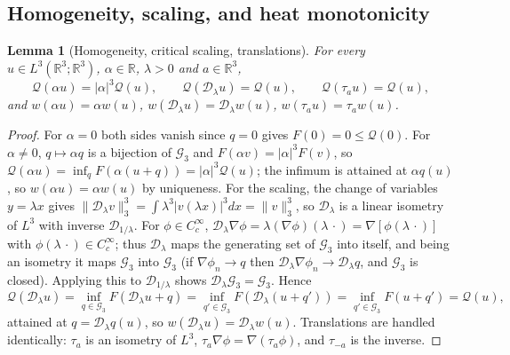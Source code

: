 \documentclass[11pt]{article}
\newtheorem{lemma}[theorem]{Lemma}
\theoremstyle{definition}
\theoremstyle{plain}
\newcommand{\R}{\mathbb R}
\newcommand{\norm}[1]{\lVert #1\rVert}
\begin{document}
\subsection{Homogeneity, scaling, and heat monotonicity}

\begin{lemma}[Homogeneity, critical scaling, translations]
\label{lem:quotient-scaling}
For every $u\in L^3(\R^3;\R^3)$, $\alpha\in\R$, $\lambda>0$ and $a\in\R^3$,
\[
 \mathcal Q(\alpha u)=|\alpha|^3\mathcal Q(u),\qquad
 \mathcal Q(\mathcal D_\lambda u)=\mathcal Q(u),\qquad
 \mathcal Q(\tau_au)=\mathcal Q(u),
\]
and $w(\alpha u)=\alpha w(u)$, $w(\mathcal D_\lambda u)=\mathcal D_\lambda w(u)$,
$w(\tau_au)=\tau_aw(u)$.
\end{lemma}

\begin{proof}
For $\alpha=0$ both sides vanish since $q=0$ gives $F(0)=0\le\mathcal Q(0)$.
For $\alpha\ne0$, $q\mapsto\alpha q$ is a bijection of $\mathcal G_3$ and
$F(\alpha v)=|\alpha|^3F(v)$, so
$\mathcal Q(\alpha u)=\inf_{q}F(\alpha(u+q))=|\alpha|^3\mathcal Q(u)$;
the infimum is attained at $\alpha q(u)$, so $w(\alpha u)=\alpha w(u)$ by
uniqueness.  For the scaling, the change of variables $y=\lambda x$ gives
$\norm{\mathcal D_\lambda v}_3^3=\int\lambda^3|v(\lambda x)|^3dx=\norm v_3^3$,
so $\mathcal D_\lambda$ is a linear isometry of $L^3$ with inverse
$\mathcal D_{1/\lambda}$.  For $\phi\in C_c^\infty$,
$\mathcal D_\lambda\nabla\phi=\lambda(\nabla\phi)(\lambda\,\cdot)
=\nabla[\phi(\lambda\,\cdot)]$ with $\phi(\lambda\,\cdot)\in C_c^\infty$;
thus $\mathcal D_\lambda$ maps the generating set of $\mathcal G_3$ into
itself, and being an isometry it maps $\mathcal G_3$ into $\mathcal G_3$
(if $\nabla\phi_n\to q$ then $\mathcal D_\lambda\nabla\phi_n\to\mathcal D_\lambda q$,
and $\mathcal G_3$ is closed).  Applying this to $\mathcal D_{1/\lambda}$
shows $\mathcal D_\lambda\mathcal G_3=\mathcal G_3$.  Hence
\[
 \mathcal Q(\mathcal D_\lambda u)
 =\inf_{q\in\mathcal G_3}F(\mathcal D_\lambda u+q)
 =\inf_{q'\in\mathcal G_3}F(\mathcal D_\lambda(u+q'))
 =\inf_{q'\in\mathcal G_3}F(u+q')=\mathcal Q(u),
\]
attained at $q=\mathcal D_\lambda q(u)$, so
$w(\mathcal D_\lambda u)=\mathcal D_\lambda w(u)$.  Translations are
handled identically: $\tau_a$ is an isometry of $L^3$,
$\tau_a\nabla\phi=\nabla(\tau_a\phi)$, and $\tau_{-a}$ is the inverse.
\end{proof}
\end{document}
